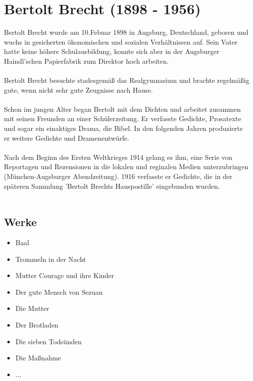 \documentclass[a4paper]{article}
\begin{document}
        \newpage
        \section{Bertolt Brecht (1898 - 1956)}

	Bertolt Brecht wurde am 10.Febuar 1898 in Augsburg, Deutschland, geboren und wuchs in gesicherten ökonomischen und sozialen Verhältnissen auf. Sein Vater hatte keine höhere Schulausbildung, konnte sich aber in der Augsburger Haindl'schen Papierfabrik zum Direktor hoch arbeiten.\\\\
        Bertolt Brecht besuchte stadesgemäß das Realgymnasium und brachte regelmäßig gute, wenn nicht sehr gute Zeugnisse nach Hause.\\\\
        Schon im jungen Alter began Bertolt mit dem Dichten und arbeitet zusammen mit seinen Freunden an einer Schülerzeitung. Er verfasste Gedichte, Prosatexte und sogar ein einaktiges Drama, die Bibel. In den folgenden Jahren produzierte er weitere Gedichte und Dramenentwürfe.\\\\
        Nach dem Beginn des Ersten Weltkrieges 1914 gelang es ihm, eine Serie von Reportagen und Rezensionen in die lokalen und reginalen Medien unterzubringen (München-Augsburger Abendzeitung). 1916 verfasste er Gedichte, die in der späteren Sammlung 'Bertolt Brechts Hauspostille' eingebunden wurden.\\\\

	\subsection{Werke}

        \begin{itemize}
        \item Baal
	\item Trommeln in der Nacht
	\item Mutter Courage und ihre Kinder
        \item Der gute Mensch von Sezuan
        \item Die Mutter
        \item Der Brotladen
        \item Die sieben Todsünden
        \item Die Maßnahme
        \item ...
          
        \end{itemize}
        
\end{document}
